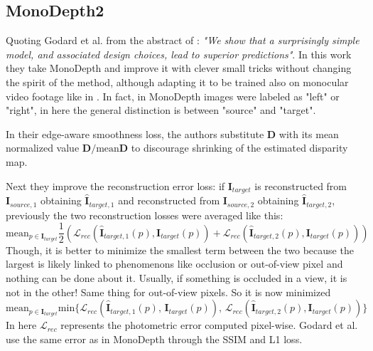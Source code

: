 \subsection{MonoDepth2}
Quoting Godard et al. from the abstract of \cite{MonoDepth2}: \textit{"We show that a surprisingly simple model, and associated design choices, lead to superior predictions"}.
In this work they take MonoDepth \cite{MonoDepth} and improve it with clever small tricks without changing the spirit of the method, although adapting it to be trained also on monocular video footage like in \cite{SfMLearner}.
In fact, in MonoDepth images were labeled as "left" or "right", in here the general distinction is between "source" and "target".

In their edge-aware smoothness loss, the authors substitute $\mathbf{D}$ with its mean normalized value $\mathbf{D} / \text{mean} \mathbf{D}$ to discourage shrinking of the estimated disparity map.

Next they improve the reconstruction error loss: if $\mathbf{I}_{target}$ is reconstructed from $\mathbf{I}_{source, 1}$ obtaining $\hat{\mathbf{I}}_{target, 1}$ and reconstructed from $\mathbf{I}_{source, 2}$ obtaining $\hat{\mathbf{I}}_{target, 2}$, previously the two reconstruction losses were averaged like this:
\[
	\text{mean}_{p \in \mathbf{I}_{target}} \frac{1}{2}(\mathcal{L}_{rec}(\hat{\mathbf{I}}_{target, 1}(p), \mathbf{I}_{target}(p)) + \mathcal{L}_{rec}(\hat{\mathbf{I}}_{target, 2}(p), \mathbf{I}_{target}(p)))
\]
Though, it is better to minimize the smallest term between the two because the largest is likely linked to phenomenons like occlusion or out-of-view pixel and nothing can be done about it.
Usually, if something is occluded in a view, it is not in the other!
Same thing for out-of-view pixels.
So it is now minimized
\[
	\text{mean}_{p \in \mathbf{I}_{target}} \text{min} \{ \mathcal{L}_{rec}(\hat{\mathbf{I}}_{target, 1}(p), \, \mathbf{I}_{target}(p)), \, \mathcal{L}_{rec}(\hat{\mathbf{I}}_{target, 2}(p), \mathbf{I}_{target}(p)) \}
\]
In here $\mathcal{L}_{rec}$ represents the photometric error computed pixel-wise.
Godard et al. use the same error as in MonoDepth through the SSIM and L1 loss.

